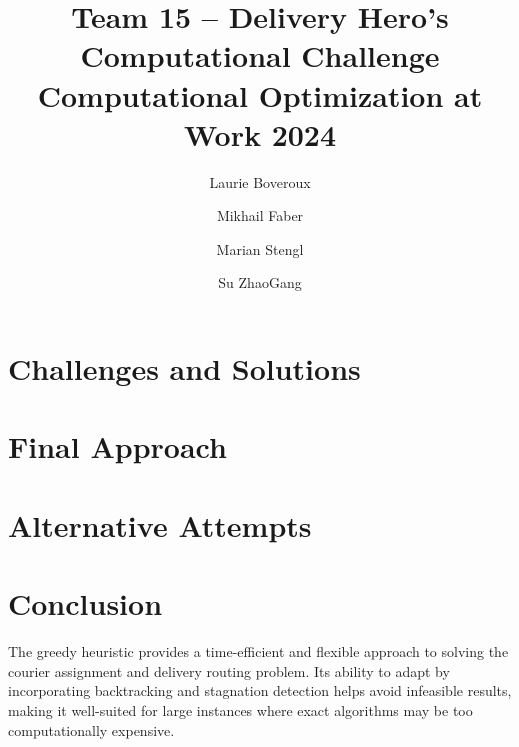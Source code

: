 \documentclass[a4paper]{article}
\title{Team 15 -- Delivery Hero's Computational Challenge \\[0.75em] \Large Computational Optimization at Work 2024}
\author{Laurie Boveroux \and
        Mikhail Faber\and
        Marian Stengl\and
        Su ZhaoGang}
\newcommand\path{.}
\begin{document}
%
\maketitle%

\section{Challenges and Solutions}%
%
\section{Final Approach}%
%
\section{Alternative Attempts}%
%
\section{Conclusion}
The greedy heuristic provides a time-efficient and flexible approach to solving the courier assignment and delivery routing problem. Its ability to adapt by incorporating backtracking and stagnation detection helps avoid infeasible results, making it well-suited for large instances where exact algorithms may be too computationally expensive.
\end{document}
